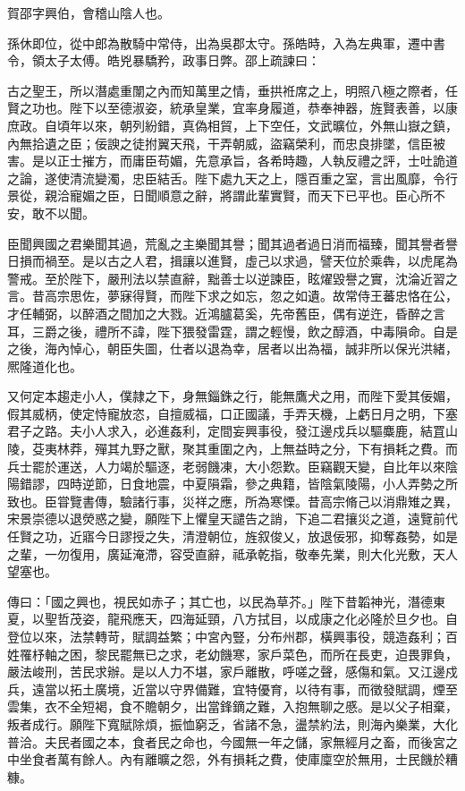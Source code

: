 \begin{pinyinscope}
 
 
 賀邵字興伯，會稽山陰人也。
 
 
 孫休即位，從中郎為散騎中常侍，出為吳郡太守。孫皓時，入為左典軍，遷中書令，領太子太傅。皓兇暴驕矜，政事日弊。邵上疏諫曰：
 
 
 
 
 古之聖王，所以潛處重闈之內而知萬里之情，垂拱袵席之上，明照八極之際者，任賢之功也。陛下以至德淑姿，統承皇業，宜率身履道，恭奉神器，旌賢表善，以康庶政。自頃年以來，朝列紛錯，真偽相貿，上下空任，文武曠位，外無山嶽之鎮，內無拾遺之臣；佞諛之徒拊翼天飛，干弄朝威，盜竊榮利，而忠良排墜，信臣被害。是以正士摧方，而庸臣苟媚，先意承旨，各希時趣，人執反禮之評，士吐詭道之論，遂使清流變濁，忠臣結舌。陛下處九天之上，隱百重之室，言出風靡，令行景從，親洽寵媚之臣，日聞順意之辭，將謂此輩實賢，而天下已平也。臣心所不安，敢不以聞。
 
 
 
 
 臣聞興國之君樂聞其過，荒亂之主樂聞其譽；聞其過者過日消而福臻，聞其譽者譽日損而禍至。是以古之人君，揖讓以進賢，虛己以求過，譬天位於乘犇，以虎尾為警戒。至於陛下，嚴刑法以禁直辭，黜善士以逆諫臣，眩燿毀譽之實，沈淪近習之言。昔高宗思佐，夢寐得賢，而陛下求之如忘，忽之如遺。故常侍王蕃忠恪在公，才任輔弼，以醉酒之間加之大戮。近鴻臚葛奚，先帝舊臣，偶有逆迕，昏醉之言耳，三爵之後，禮所不諱，陛下猥發雷霆，謂之輕慢，飲之醇酒，中毒隕命。自是之後，海內悼心，朝臣失圖，仕者以退為幸，居者以出為福，誠非所以保光洪緒，熈隆道化也。
 
 
 
 
 又何定本趨走小人，僕隷之下，身無錙銖之行，能無鷹犬之用，而陛下愛其佞媚，假其威柄，使定恃寵放恣，自擅威福，口正國議，手弄天機，上虧日月之明，下塞君子之路。夫小人求入，必進姦利，定間妄興事役，發江邊戍兵以驅麋鹿，結罝山陵，芟夷林莽，殫其九野之獸，聚其重圍之內，上無益時之分，下有損耗之費。而兵士罷於運送，人力竭於驅逐，老弱饑凍，大小怨歎。臣竊觀天變，自比年以來陰陽錯謬，四時逆節，日食地震，中夏隕霜，參之典籍，皆陰氣陵陽，小人弄勢之所致也。臣甞覽書傳，驗諸行事，災祥之應，所為寒慄。昔高宗脩己以消鼎雉之異，宋景崇德以退熒惑之變，願陛下上懼皇天譴告之誚，下追二君攘災之道，遠覽前代任賢之功，近寤今日謬授之失，清澄朝位，旌叙俊乂，放退佞邪，抑奪姦勢，如是之輩，一勿復用，廣延淹滯，容受直辭，祗承乾指，敬奉先業，則大化光敷，天人望塞也。
 
 
 
 
 傳曰：「國之興也，視民如赤子；其亡也，以民為草芥。」陛下昔韜神光，潛德東夏，以聖哲茂姿，龍飛應天，四海延頸，八方拭目，以成康之化必隆於旦夕也。自登位以來，法禁轉苛，賦調益繁；中宮內豎，分布州郡，橫興事役，競造姦利；百姓罹杼軸之困，黎民罷無已之求，老幼饑寒，家戶菜色，而所在長吏，迫畏罪負，嚴法峻刑，苦民求辦。是以人力不堪，家戶離散，呼嗟之聲，感傷和氣。又江邊戍兵，遠當以拓土廣境，近當以守界備難，宜特優育，以待有事，而徵發賦調，煙至雲集，衣不全短褐，食不贍朝夕，出當鋒鏑之難，入抱無聊之慼。是以父子相棄，叛者成行。願陛下寬賦除煩，振恤窮乏，省諸不急，盪禁約法，則海內樂業，大化普洽。夫民者國之本，食者民之命也，今國無一年之儲，家無經月之畜，而後宮之中坐食者萬有餘人。內有離曠之怨，外有損耗之費，使庫廩空於無用，士民饑於糟糠。
 

\end{pinyinscope}

